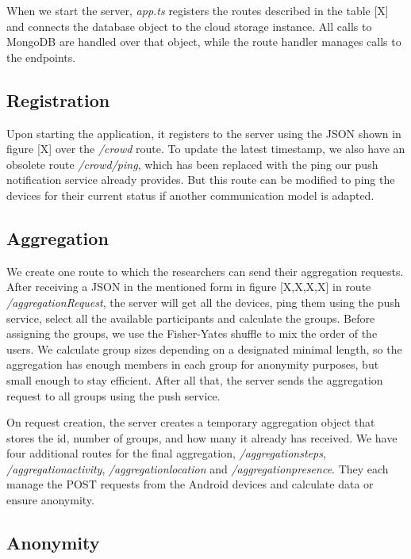 When we start the server, \textit{app.ts} registers the routes described in the table [X] and connects the database object to the cloud storage instance. All calls to MongoDB are handled over that object, while the route handler manages calls to the endpoints.

\subsection{Registration}

Upon starting the application, it registers to the server using the JSON shown in figure [X] over the \textit{/crowd} route. To update the latest timestamp, we also have an obsolete route \textit{/crowd/ping}, which has been replaced with the ping our push notification service already provides. But this route can be modified to ping the devices for their current status if another communication model is adapted.

\subsection{Aggregation}

We create one route to which the researchers can send their aggregation requests. After receiving a JSON in the mentioned form in figure [X,X,X,X] in route \textit{/aggregationRequest}, the server will get all the devices, ping them using the push service, select all the available participants and calculate the groups. Before assigning the groups, we use the Fisher-Yates shuffle to mix the order of the users. We calculate group sizes depending on a designated minimal length, so the aggregation has enough members in each group for anonymity purposes, but small enough to stay efficient. After all that, the server sends the aggregation request to all groups using the push service.

On request creation, the server creates a temporary aggregation object that stores the id, number of groups, and how many it already has received. We have four additional routes for the final aggregation, \textit{/aggregationsteps}, \textit{/aggregationactivity}, \textit{/aggregationlocation} and \textit{/aggregationpresence}. They each manage the POST requests from the Android devices and calculate data or ensure anonymity.

\subsection{Anonymity}

